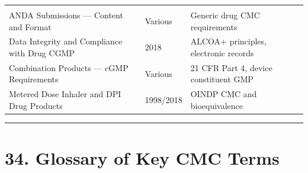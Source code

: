 \documentclass[
  11pt,
  a4paper,
]{report}
\begin{document}
\begin{longtable}[]{@{}lll@{}}
\begin{minipage}[t]{0.28\columnwidth}
\end{minipage}\tabularnewline
\begin{minipage}[t]{0.40\columnwidth}\raggedright
ANDA Submissions --- Content and Format\strut
\end{minipage} & \begin{minipage}[t]{0.24\columnwidth}\raggedright
Various\strut
\end{minipage} & \begin{minipage}[t]{0.28\columnwidth}\raggedright
Generic drug CMC requirements\strut
\end{minipage}\tabularnewline
\begin{minipage}[t]{0.40\columnwidth}\raggedright
Data Integrity and Compliance with Drug CGMP\strut
\end{minipage} & \begin{minipage}[t]{0.24\columnwidth}\raggedright
2018\strut
\end{minipage} & \begin{minipage}[t]{0.28\columnwidth}\raggedright
ALCOA+ principles, electronic records\strut
\end{minipage}\tabularnewline
\begin{minipage}[t]{0.40\columnwidth}\raggedright
Combination Products --- cGMP Requirements\strut
\end{minipage} & \begin{minipage}[t]{0.24\columnwidth}\raggedright
Various\strut
\end{minipage} & \begin{minipage}[t]{0.28\columnwidth}\raggedright
21 CFR Part 4, device constituent GMP\strut
\end{minipage}\tabularnewline
\begin{minipage}[t]{0.40\columnwidth}\raggedright
Metered Dose Inhaler and DPI Drug Products\strut
\end{minipage} & \begin{minipage}[t]{0.24\columnwidth}\raggedright
1998/2018\strut
\end{minipage} & \begin{minipage}[t]{0.28\columnwidth}\raggedright
OINDP CMC and bioequivalence\strut
\end{minipage}\tabularnewline
\bottomrule
\end{longtable}

\begin{center}\rule{0.5\linewidth}{0.5pt}\end{center}

\hypertarget{glossary-of-key-cmc-terms}{%
\section{34. Glossary of Key CMC
Terms}\label{glossary-of-key-cmc-terms}}
\end{document}
